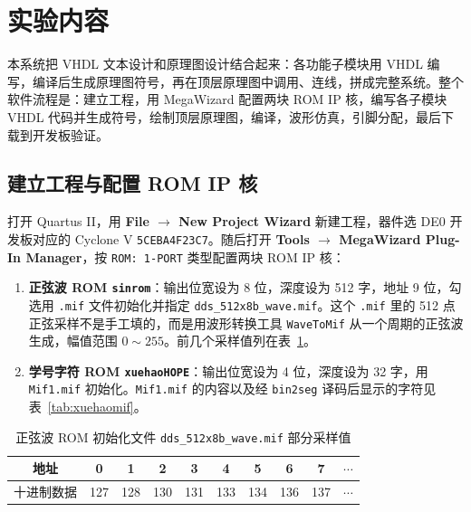 \documentclass[12pt]{ctexart}
\begin{document}
\section{实验内容}

本系统把 VHDL 文本设计和原理图设计结合起来：各功能子模块用 VHDL 编写，编译后生成原理图符号，再在顶层原理图中调用、连线，拼成完整系统。整个软件流程是：建立工程，用 MegaWizard 配置两块 ROM IP 核，编写各子模块 VHDL 代码并生成符号，绘制顶层原理图，编译，波形仿真，引脚分配，最后下载到开发板验证。

\subsection{建立工程与配置 ROM IP 核}

打开 Quartus II，用 \textbf{File $\rightarrow$ New Project Wizard} 新建工程，器件选 DE0 开发板对应的 Cyclone V \texttt{5CEBA4F23C7}。随后打开 \textbf{Tools $\rightarrow$ MegaWizard Plug-In Manager}，按 \texttt{ROM: 1-PORT} 类型配置两块 ROM IP 核：

\begin{enumerate}
    \item \textbf{正弦波 ROM \texttt{sinrom}}：输出位宽设为 8 位，深度设为 512 字，地址 9 位，勾选用 \texttt{.mif} 文件初始化并指定 \texttt{dds\_512x8b\_wave.mif}。这个 \texttt{.mif} 里的 512 点正弦采样不是手工填的，而是用波形转换工具 \texttt{WaveToMif} 从一个周期的正弦波生成，幅值范围 $0\sim255$。前几个采样值列在表~\ref{tab:sinmif}。
    \item \textbf{学号字符 ROM \texttt{xuehaoHOPE}}：输出位宽设为 4 位，深度设为 32 字，用 \texttt{Mif1.mif} 初始化。\texttt{Mif1.mif} 的内容以及经 \texttt{bin2seg} 译码后显示的字符见表~\ref{tab:xuehaomif}。
\end{enumerate}

\begin{table}[H]
    \centering
    \caption{正弦波 ROM 初始化文件 \texttt{dds\_512x8b\_wave.mif} 部分采样值}
    \label{tab:sinmif}
    \begin{tabular}{cccccccccc}
        \toprule
        地址 & 0 & 1 & 2 & 3 & 4 & 5 & 6 & 7 & $\cdots$ \\
        \midrule
        十进制数据 & 127 & 128 & 130 & 131 & 133 & 134 & 136 & 137 & $\cdots$ \\
        \bottomrule
    \end{tabular}
\end{table}
\end{document}
